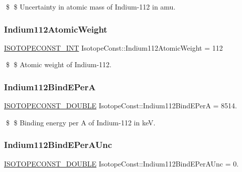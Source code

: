 \$ \$ Uncertainty in atomic mass of Indium-\/112 in amu. \mbox{\label{group___isotope_const-_indium-_in112_ga358c507648f335595f76f39b1484c5a2}} 
\subsubsection{\texorpdfstring{Indium112\+Atomic\+Weight}{Indium112AtomicWeight}}
{\footnotesize\ttfamily \mbox{\hyperlink{group___isotope_const-_macros_ga5f18360b3e99483a35c32d789e62621c}{I\+S\+O\+T\+O\+P\+E\+C\+O\+N\+S\+T\+\_\+\+I\+NT}} Isotope\+Const\+::\+Indium112\+Atomic\+Weight = 112}

\$ \$ Atomic weight of Indium-\/112. \mbox{\label{group___isotope_const-_indium-_in112_ga33b5b246f05b9b5eda6ae18d7c622cbe}} 
\subsubsection{\texorpdfstring{Indium112\+Bind\+E\+PerA}{Indium112BindEPerA}}
{\footnotesize\ttfamily \mbox{\hyperlink{group___isotope_const-_macros_ga8f45a7272ce02c0b4c65c44636ed719a}{I\+S\+O\+T\+O\+P\+E\+C\+O\+N\+S\+T\+\_\+\+D\+O\+U\+B\+LE}} Isotope\+Const\+::\+Indium112\+Bind\+E\+PerA = 8514.}

\$ \$ Binding energy per A of Indium-\/112 in keV. \mbox{\label{group___isotope_const-_indium-_in112_ga02214fbda861898a1c3e02c25d58d730}} 
\subsubsection{\texorpdfstring{Indium112\+Bind\+E\+Per\+A\+Unc}{Indium112BindEPerAUnc}}
{\footnotesize\ttfamily \mbox{\hyperlink{group___isotope_const-_macros_ga8f45a7272ce02c0b4c65c44636ed719a}{I\+S\+O\+T\+O\+P\+E\+C\+O\+N\+S\+T\+\_\+\+D\+O\+U\+B\+LE}} Isotope\+Const\+::\+Indium112\+Bind\+E\+Per\+A\+Unc = 0.}

